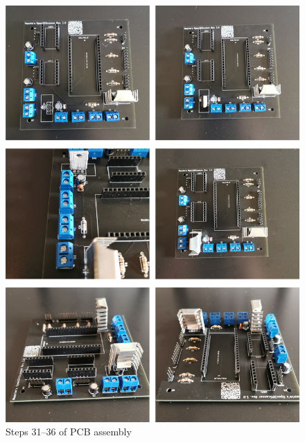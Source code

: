 \begin{figure}[ht!]%
	\begin{centered}%
		\includegraphics[width=\linewidth]{images/PcbSeries6.jpg}%
		\caption{Steps \numrange[text-rm=\lightBoldFont]{31}{36} of PCB assembly}%
	\end{centered}%
\end{figure}%

